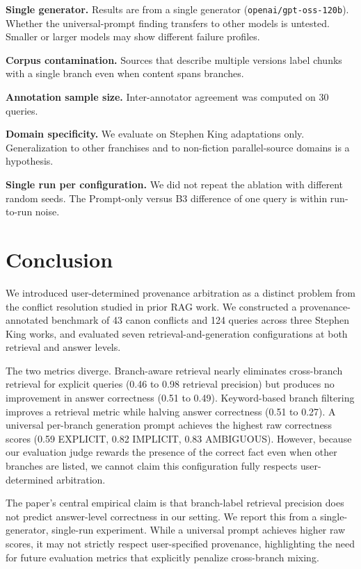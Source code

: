 \documentclass[conference]{IEEEtran}
\begin{document}
\textbf{Single generator.} Results are from a single generator (\texttt{openai/gpt-oss-120b}). Whether the universal-prompt finding transfers to other models is untested. Smaller or larger models may show different failure profiles.

\textbf{Corpus contamination.} Sources that describe multiple versions label chunks with a single branch even when content spans branches.

\textbf{Annotation sample size.} Inter-annotator agreement was computed on 30 queries.

\textbf{Domain specificity.} We evaluate on Stephen King adaptations only. Generalization to other franchises and to non-fiction parallel-source domains is a hypothesis.

\textbf{Single run per configuration.} We did not repeat the ablation with different random seeds. The Prompt-only versus B3 difference of one query is within run-to-run noise.

\section{Conclusion}

We introduced user-determined provenance arbitration as a distinct problem from the conflict resolution studied in prior RAG work. We constructed a provenance-annotated benchmark of 43 canon conflicts and 124 queries across three Stephen King works, and evaluated seven retrieval-and-generation configurations at both retrieval and answer levels.

The two metrics diverge. Branch-aware retrieval nearly eliminates cross-branch retrieval for explicit queries (0.46 to 0.98 retrieval precision) but produces no improvement in answer correctness (0.51 to 0.49). Keyword-based branch filtering improves a retrieval metric while halving answer correctness (0.51 to 0.27). A universal per-branch generation prompt achieves the highest raw correctness scores (0.59 EXPLICIT, 0.82 IMPLICIT, 0.83 AMBIGUOUS). However, because our evaluation judge rewards the presence of the correct fact even when other branches are listed, we cannot claim this configuration fully respects user-determined arbitration.

The paper's central empirical claim is that branch-label retrieval precision does not predict answer-level correctness in our setting. We report this from a single-generator, single-run experiment. While a universal prompt achieves higher raw scores, it may not strictly respect user-specified provenance, highlighting the need for future evaluation metrics that explicitly penalize cross-branch mixing.
\end{document}
